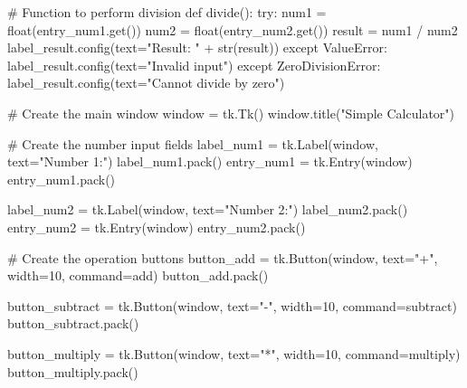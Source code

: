 \documentclass[
  letterpaper,
]{book}
\newenvironment{Shaded}{\begin{snugshade}}{\end{snugshade}}
\newcommand{\BuiltInTok}[1]{\textcolor[rgb]{0.00,0.23,0.31}{#1}}
\newcommand{\CommentTok}[1]{\textcolor[rgb]{0.37,0.37,0.37}{#1}}
\newcommand{\ControlFlowTok}[1]{\textcolor[rgb]{0.00,0.23,0.31}{#1}}
\newcommand{\DecValTok}[1]{\textcolor[rgb]{0.68,0.00,0.00}{#1}}
\newcommand{\KeywordTok}[1]{\textcolor[rgb]{0.00,0.23,0.31}{#1}}
\newcommand{\NormalTok}[1]{\textcolor[rgb]{0.00,0.23,0.31}{#1}}
\newcommand{\OperatorTok}[1]{\textcolor[rgb]{0.37,0.37,0.37}{#1}}
\newcommand{\PreprocessorTok}[1]{\textcolor[rgb]{0.68,0.00,0.00}{#1}}
\newcommand{\StringTok}[1]{\textcolor[rgb]{0.13,0.47,0.30}{#1}}
\begin{document}
\begin{Shaded}
\begin{Highlighting}[]
\CommentTok{\# Function to perform division}
\KeywordTok{def}\NormalTok{ divide():}
    \ControlFlowTok{try}\NormalTok{:}
\NormalTok{        num1 }\OperatorTok{=} \BuiltInTok{float}\NormalTok{(entry\_num1.get())}
\NormalTok{        num2 }\OperatorTok{=} \BuiltInTok{float}\NormalTok{(entry\_num2.get())}
\NormalTok{        result }\OperatorTok{=}\NormalTok{ num1 }\OperatorTok{/}\NormalTok{ num2}
\NormalTok{        label\_result.config(text}\OperatorTok{=}\StringTok{"Result: "} \OperatorTok{+} \BuiltInTok{str}\NormalTok{(result))}
    \ControlFlowTok{except} \PreprocessorTok{ValueError}\NormalTok{:}
\NormalTok{        label\_result.config(text}\OperatorTok{=}\StringTok{"Invalid input"}\NormalTok{)}
    \ControlFlowTok{except} \PreprocessorTok{ZeroDivisionError}\NormalTok{:}
\NormalTok{        label\_result.config(text}\OperatorTok{=}\StringTok{"Cannot divide by zero"}\NormalTok{)}

\CommentTok{\# Create the main window}
\NormalTok{window }\OperatorTok{=}\NormalTok{ tk.Tk()}
\NormalTok{window.title(}\StringTok{"Simple Calculator"}\NormalTok{)}

\CommentTok{\# Create the number input fields}
\NormalTok{label\_num1 }\OperatorTok{=}\NormalTok{ tk.Label(window, text}\OperatorTok{=}\StringTok{"Number 1:"}\NormalTok{)}
\NormalTok{label\_num1.pack()}
\NormalTok{entry\_num1 }\OperatorTok{=}\NormalTok{ tk.Entry(window)}
\NormalTok{entry\_num1.pack()}

\NormalTok{label\_num2 }\OperatorTok{=}\NormalTok{ tk.Label(window, text}\OperatorTok{=}\StringTok{"Number 2:"}\NormalTok{)}
\NormalTok{label\_num2.pack()}
\NormalTok{entry\_num2 }\OperatorTok{=}\NormalTok{ tk.Entry(window)}
\NormalTok{entry\_num2.pack()}

\CommentTok{\# Create the operation buttons}
\NormalTok{button\_add }\OperatorTok{=}\NormalTok{ tk.Button(window, text}\OperatorTok{=}\StringTok{"+"}\NormalTok{, width}\OperatorTok{=}\DecValTok{10}\NormalTok{, command}\OperatorTok{=}\NormalTok{add)}
\NormalTok{button\_add.pack()}

\NormalTok{button\_subtract }\OperatorTok{=}\NormalTok{ tk.Button(window, text}\OperatorTok{=}\StringTok{"{-}"}\NormalTok{, width}\OperatorTok{=}\DecValTok{10}\NormalTok{, command}\OperatorTok{=}\NormalTok{subtract)}
\NormalTok{button\_subtract.pack()}

\NormalTok{button\_multiply }\OperatorTok{=}\NormalTok{ tk.Button(window, text}\OperatorTok{=}\StringTok{"*"}\NormalTok{, width}\OperatorTok{=}\DecValTok{10}\NormalTok{, command}\OperatorTok{=}\NormalTok{multiply)}
\NormalTok{button\_multiply.pack()}


\end{Highlighting}
\end{Shaded}
\end{document}
